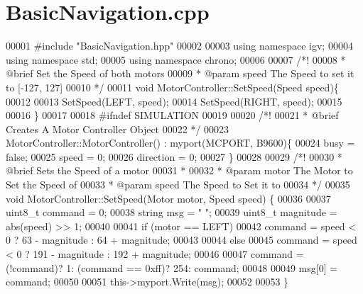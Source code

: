 \hypertarget{BasicNavigation_8cpp_source}{}\section{Basic\+Navigation.\+cpp}
\label{BasicNavigation_8cpp_source}

\begin{DoxyCode}
00001 \textcolor{preprocessor}{#}\textcolor{preprocessor}{include} \textcolor{preprocessor}{"BasicNavigation.hpp"}
00002 
00003 \textcolor{keyword}{using} \textcolor{keyword}{namespace} igv;
00004 \textcolor{keyword}{using} \textcolor{keyword}{namespace} std;
00005 \textcolor{keyword}{using} \textcolor{keyword}{namespace} chrono;
00006 
00007 \textcolor{comment}{/*!}
00008 \textcolor{comment}{  * @brief Set the Speed of both motors}
00009 \textcolor{comment}{  * @param speed The Speed to set it to [-127, 127]}
00010 \textcolor{comment}{  */}
00011 \textcolor{keywordtype}{void} MotorController::SetSpeed(Speed speed)\{
00012 
00013   SetSpeed(LEFT, speed);
00014   SetSpeed(RIGHT, speed);
00015 
00016 \}
00017 
00018 \textcolor{preprocessor}{#}\textcolor{preprocessor}{ifndef} \textcolor{preprocessor}{SIMULATION}
00019 
00020 \textcolor{comment}{/*!}
00021 \textcolor{comment}{  * @brief Creates A Motor Controller Object}
00022 \textcolor{comment}{*/}
00023 MotorController::MotorController() : myport(MCPORT, B9600)\{
00024   busy = \textcolor{keyword}{false};
00025   speed = 0;
00026   direction = 0;
00027 \}
00028 
00029 \textcolor{comment}{/*!}
00030 \textcolor{comment}{  * @brief Sets the Speed of a motor}
00031 \textcolor{comment}{  * }
00032 \textcolor{comment}{  * @param motor The Motor to Set the Speed of}
00033 \textcolor{comment}{  * @param speed The Speed to Set it to}
00034 \textcolor{comment}{*/}
00035 \textcolor{keywordtype}{void} MotorController::SetSpeed(Motor motor, Speed speed) \{
00036 
00037   uint8\_t command = 0;
00038   string msg = \textcolor{stringliteral}{" "};
00039   uint8\_t magnitude = abs(speed) >> 1;
00040 
00041   \textcolor{keywordflow}{if} (motor == LEFT)
00042     command = speed < 0 ? 63 - magnitude : 64 + magnitude;
00043 
00044   \textcolor{keywordflow}{else}
00045     command = speed < 0 ? 191 - magnitude : 192 + magnitude;
00046 
00047   command = (!command)? 1: (command == 0xff)? 254: command;
00048 
00049   msg[0] = command;
00050 
00051   \textcolor{keyword}{this}->myport.Write(msg);
00052 
00053 \}

\end{DoxyCode}
